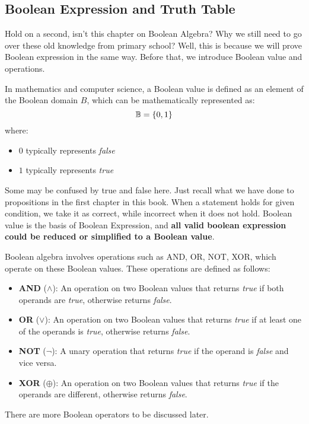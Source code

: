    \subsection{Boolean Expression and Truth Table}
        Hold on a second, isn't this chapter on Boolean Algebra? Why we still need to go over these
        old knowledge from primary school? Well, this is because we will prove Boolean expression in the
        same way. Before that, we introduce Boolean value and operations. 
        \begin{definition}
        In mathematics and computer science, a Boolean value is defined as an element of the Boolean domain \(B\), which can be mathematically represented as:
        \[
        \mathbb{B} = \{0, 1\}
        \]
        where:
        \begin{itemize}
            \item \(0\) typically represents \textit{false}
            \item \(1\) typically represents \textit{true}
        \end{itemize}
        \end{definition}
        Some may be confused by true and false here. Just recall what we have done to propositions in
        the first chapter in this book. When a statement holds for given condition, we take it as
        correct, while incorrect when it does not hold. Boolean value is the basis of Boolean Expression,
        and \textbf{all valid boolean expression could be reduced or simplified to a Boolean value}.
        \begin{definition}
        Boolean algebra involves operations such as AND, OR, NOT, XOR, which operate on these Boolean values. These operations are defined as follows:
        \begin{itemize}
            \item \textbf{AND} (\(\land\)): An operation on two Boolean values that returns \textit{true} if both operands are \textit{true}, otherwise returns \textit{false}.
            \item \textbf{OR} (\(\lor\)): An operation on two Boolean values that returns \textit{true} if at least one of the operands is \textit{true}, otherwise returns \textit{false}.
            \item \textbf{NOT} (\(\lnot\)): A unary operation that returns \textit{true} if the operand is \textit{false} and vice versa.
            \item \textbf{XOR} (\(\oplus\)): An operation on two Boolean values that returns \textit{true} if the operands are different, otherwise returns \textit{false}.
        \end{itemize}
        \begin{remark}
            There are more Boolean operators to be discussed later.
        \end{remark}
        \end{definition}
